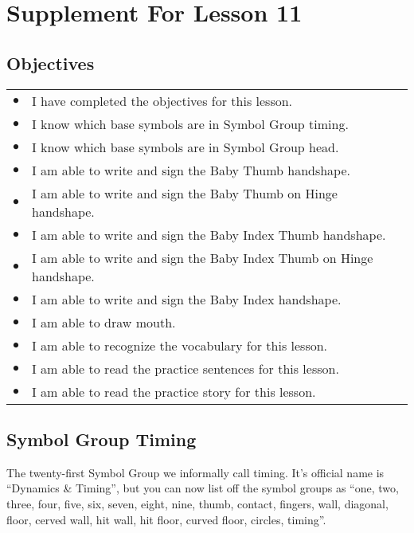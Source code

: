 \documentclass{article}
\begin{document}
\newfontfamily{}
\newfontfamily{}
\newcommand{\bul}{\hfil$\bullet$&}
\renewenvironment{glossary}{\begin{multicols}{5}\begin{center}}{\end{center}\end{multicols}}
\setcounter{secnumdepth}{0}
\setlength{\columnseprule}{1pt}

\section{Supplement For Lesson 11}

\subsection{Objectives}

\begin{tabular}{p{1cm}p{14cm}}
\bul I have completed the objectives for this lesson.\\
\bul I know which base symbols are in Symbol Group timing.\\
\bul I know which base symbols are in Symbol Group head.\\
\bul I am able to write and sign the Baby Thumb handshape.\\
\bul I am able to write and sign the Baby Thumb on Hinge handshape.\\
\bul I am able to write and sign the Baby Index Thumb handshape.\\
\bul I am able to write and sign the Baby Index Thumb on Hinge handshape.\\
\bul I am able to write and sign the Baby Index handshape.\\
\bul I am able to draw mouth.\\
\bul I am able to recognize the vocabulary for this lesson.\\
\bul I am able to read the practice sentences for this lesson.\\
\bul I am able to read the practice story for this lesson.\\
\end{tabular}

\subsection{Symbol Group Timing}

The twenty-first Symbol Group we informally call timing.
It's official name is ``Dynamics \& Timing'', but you can now list off the symbol groups as ``one, two, three, four, five, six, seven, eight, nine, thumb, contact, fingers, wall, diagonal, floor, cerved wall, hit wall, hit floor, curved floor, circles, timing''.
\end{document}

